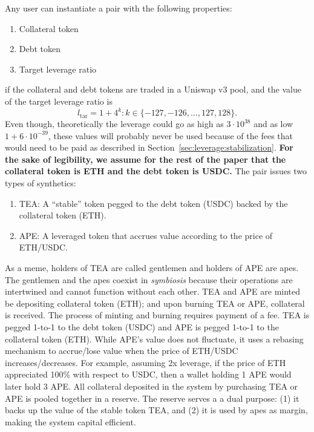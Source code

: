 \documentclass[journal,letterpaper,oneside,onecolumn,12pt]{IEEEtran}
\begin{document}
	Any user can instantiate a pair with the following properties:
	\begin{enumerate}
		\item Collateral token
		\item Debt token
		\item Target leverage ratio
	\end{enumerate}
	if the collateral and debt tokens are traded in a Uniswap v3 pool, and the value of the target leverage ratio is
	\begin{equation}
		l_\textrm{tar} = 1+4^k : k\in\{-127,-126,\ldots,127,128\}.
	\end{equation}
	Even though, theoretically the leverage could go as high as $3\cdot10^{38}$ and as low $1+6\cdot10^{-39}$, these values will probably never be used because of the fees that would need to be paid as described in Section~\ref{sec:leverage:stabilization}.
	\textbf{For the sake of legibility, we assume for the rest of the paper that the collateral token is ETH and the debt token is USDC.}
	The pair issues two types of synthetics:
	\begin{enumerate}
		\item TEA: A ``stable'' token pegged to the debt token (USDC) backed by the collateral token (ETH).
		\item APE: A leveraged token that accrues value according to the price of ETH/USDC.
	\end{enumerate}
	As a meme, holders of TEA are called gentlemen and holders of APE are apes. The gentlemen and the apes coexist in \textit{symbiosis} because their operations are intertwined and cannot function without each other. TEA and APE are minted be depositing collateral token (ETH); and upon burning TEA or APE, collateral is received. The process of minting and burning requires payment of a fee.
	TEA is pegged 1-to-1 to the debt token (USDC) and APE is pegged 1-to-1 to the collateral token (ETH). While APE's value does not fluctuate, it uses a rebasing mechanism to accrue/lose value when the price of ETH/USDC increases/decreases. For example, assuming 2x leverage, if the price of ETH appreciated 100\% with respect to USDC, then a wallet holding 1 APE would later hold 3 APE.
	All collateral deposited in the system by purchasing TEA or APE is pooled together in a 
	reserve. 
	The reserve serves a a dual purpose: (1) it backs up the value of the stable token TEA, and (2) it is used by apes as margin, making the system capital efficient.
\end{document}
